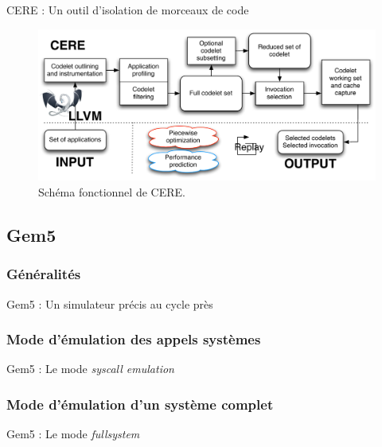 \documentclass{beamer}
\begin{document}
\begin{frame}{CERE : Un outil d'isolation de morceaux de code}
\begin{figure}[ht]
\begin{center}
\includegraphics[width=0.85\linewidth]{cere_fonction.pdf}
\caption{\label{CERE_schema}Schéma fonctionnel de CERE.}
\end{center}
\end{figure}
\end{frame}

\subsection{Gem5}
\subsubsection{Généralités}
\begin{frame}{Gem5 : Un simulateur précis au cycle près}
\end{frame}

\subsubsection{Mode d'émulation des appels systèmes}
\begin{frame}{Gem5 : Le mode \textit{syscall emulation}}
\end{frame}


\subsubsection{Mode d'émulation d'un système complet}
\begin{frame}{Gem5 : Le mode \textit{fullsystem}}
\end{frame}
\end{document}
